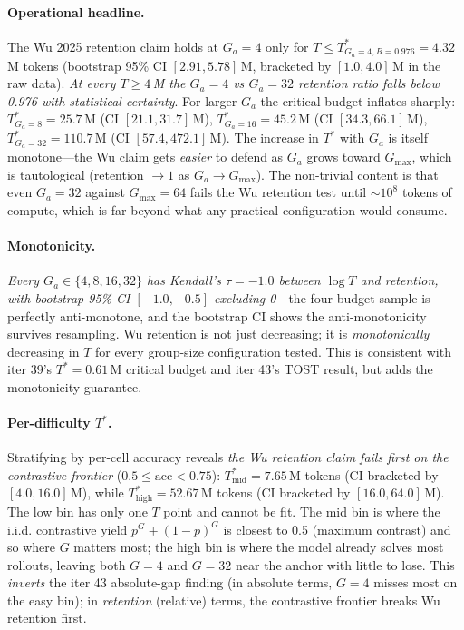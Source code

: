 \paragraph{Operational headline.}
The Wu 2025 retention claim holds at $G_a{=}4$ only for $T \le
T^*_{G_a{=}4, R{=}0.976} = 4.32$\,M tokens (bootstrap 95\% CI
$[2.91, 5.78]$\,M, bracketed by $[1.0, 4.0]$\,M in the raw data).
\emph{At every $T \ge 4$\,M the $G_a{=}4$ vs $G_a{=}32$ retention
ratio falls below 0.976 with statistical certainty}.  For larger
$G_a$ the critical budget inflates sharply: $T^*_{G_a{=}8} =
25.7$\,M (CI $[21.1, 31.7]$\,M), $T^*_{G_a{=}16} = 45.2$\,M (CI
$[34.3, 66.1]$\,M), $T^*_{G_a{=}32} = 110.7$\,M (CI $[57.4,
472.1]$\,M).  The increase in $T^*$ with $G_a$ is itself
monotone---the Wu claim gets \emph{easier} to defend as $G_a$ grows
toward $G_{\max}$, which is tautological (retention $\to 1$ as
$G_a \to G_{\max}$).  The non-trivial content is that even $G_a{=}32$
against $G_{\max}{=}64$ fails the Wu retention test until
$\sim 10^8$ tokens of compute, which is far beyond what any practical
configuration would consume.

\paragraph{Monotonicity.}
\emph{Every $G_a \in \{4, 8, 16, 32\}$ has Kendall's $\tau = -1.0$
between $\log T$ and retention, with bootstrap 95\% CI
$[-1.0, -0.5]$ excluding 0}---the four-budget sample is perfectly
anti-monotone, and the bootstrap CI shows the anti-monotonicity
survives resampling.  Wu retention is not just decreasing; it is
\emph{monotonically} decreasing in $T$ for every group-size
configuration tested.  This is consistent with iter 39's $T^*{=}0.61$\,M
critical budget and iter 43's TOST result, but adds the monotonicity
guarantee.

\paragraph{Per-difficulty $T^*$.}
Stratifying by per-cell accuracy reveals \emph{the Wu retention claim
fails first on the contrastive frontier} ($0.5 \le \text{acc} < 0.75$):
$T^*_{\text{mid}} = 7.65$\,M tokens (CI bracketed by $[4.0, 16.0]$\,M),
while $T^*_{\text{high}} = 52.67$\,M tokens (CI bracketed by
$[16.0, 64.0]$\,M).  The low bin has only one $T$ point and cannot be
fit.  The mid bin is where the i.i.d. contrastive yield
$p^G + (1-p)^G$ is closest to 0.5 (maximum contrast) and so where $G$
matters most; the high bin is where the model already solves most
rollouts, leaving both $G{=}4$ and $G{=}32$ near the anchor with
little to lose.  This \emph{inverts} the iter 43 absolute-gap finding
(in absolute terms, $G{=}4$ misses most on the easy bin); in
\emph{retention} (relative) terms, the contrastive frontier breaks
Wu retention first.

